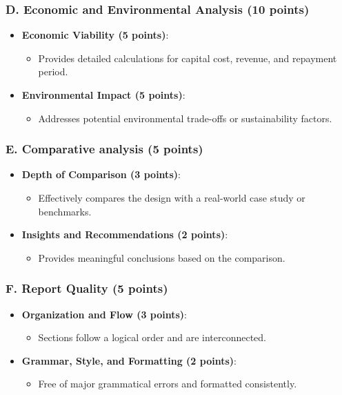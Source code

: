 \documentclass[11pt]{article}
\begin{document}
\subsubsection*{D. Economic and Environmental Analysis (10 points)}
\begin{itemize}
    \item \textbf{Economic Viability (5 points)}:
    \begin{itemize}
        \item Provides detailed calculations for capital cost, revenue, and repayment period.
    \end{itemize}
    \item \textbf{Environmental Impact (5 points)}:
    \begin{itemize}
        \item Addresses potential environmental trade-offs or sustainability factors.
    \end{itemize}
\end{itemize}

\subsubsection*{E. Comparative analysis (5 points)}
\begin{itemize}
    \item \textbf{Depth of Comparison (3 points)}:
    \begin{itemize}
        \item Effectively compares the design with a real-world case study or benchmarks.
    \end{itemize}
    \item \textbf{Insights and Recommendations (2 points)}:
    \begin{itemize}
        \item Provides meaningful conclusions based on the comparison.
    \end{itemize}
\end{itemize}

\subsubsection*{F. Report Quality (5 points)}
\begin{itemize}
    \item \textbf{Organization and Flow (3 points)}:
    \begin{itemize}
        \item Sections follow a logical order and are interconnected.
    \end{itemize}
    \item \textbf{Grammar, Style, and Formatting (2 points)}:
    \begin{itemize}
        \item Free of major grammatical errors and formatted consistently.
    \end{itemize}
\end{itemize}
\end{document}
